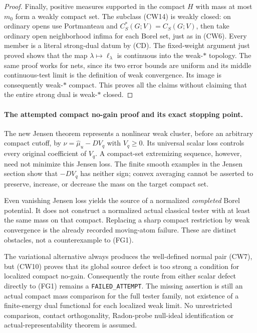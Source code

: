 \documentclass[11pt,a4paper]{article}
\numberwithin{equation}{section}
\theoremstyle{definition}
\theoremstyle{remark}
\begin{document}
\begin{proof}
Finally, positive measures supported in the compact $H$
with mass at most $m_0$ form a weakly compact set.
The subclass (CW14) is weakly closed: on ordinary
opens use Portmanteau and
$C_S^*(G;V)=C_S(G;V)$, then take ordinary open
neighborhood infima for each Borel set, just as in
(CW6). Every member is a literal strong-dual datum
by (CD). The fixed-weight argument just proved shows
that the map $\lambda\mapsto\ell_\lambda$ is
continuous into the weak-$*$ topology. The same proof
works for nets, since its two error bounds are uniform
and its middle continuous-test limit is the definition
of weak convergence. Its image is consequently
weak-$*$ compact. This proves all the claims without
claiming that the entire strong dual is weak-$*$ closed.
\end{proof}

\paragraph{The attempted compact no-gain proof and its exact stopping point.}
The new Jensen theorem represents a nonlinear weak cluster,
before an arbitrary compact cutoff, by
$\nu=\widehat\mu_u-DV_q$ with $V_q\geq0$.
Its universal scalar loss controls every original coefficient
of $V_q$. A compact-set extremizing sequence, however, need
not minimize this Jensen loss. The finite smooth examples
in the Jensen section show that $-DV_q$ has neither sign;
convex averaging cannot be asserted to preserve, increase,
or decrease the mass on the target compact set.

Even vanishing Jensen loss yields the source of a normalized
\emph{completed} Borel potential. It does not construct a
normalized actual classical tester with at least the same
mass on that compact. Replacing a sharp compact restriction
by weak convergence is the already recorded moving-atom
failure. These are distinct obstacles, not a counterexample
to (FG1).

The variational alternative always produces the well-defined
normal pair (CW7), but (CW10) proves that its global source
defect is too strong a condition for localized compact no-gain.
Consequently the route from either scalar defect directly to
(FG1) remains a \texttt{FAILED\_ATTEMPT}. The missing
assertion is still an actual compact mass comparison for the
full tester family, not existence of a finite-energy dual
functional for each localized weak limit. No unrestricted
comparison, contact orthogonality, Radon-probe null-ideal
identification or actual-representability theorem is assumed.
\end{document}
